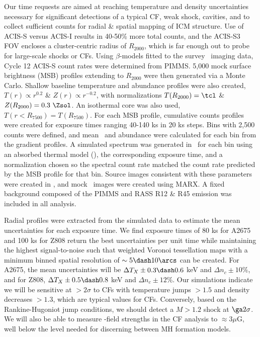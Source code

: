 \documentclass[letterpaper,11pt]{article}
\begin{document}
 Our time requests are aimed
at reaching temperature and density uncertainties necessary for
significant detections of a typical CF, weak shock, cavities, and to
collect sufficient counts for radial \& spatial mapping of ICM
structure. Use of ACIS-S versus ACIS-I results in 40-50\% more total
counts, and the ACIS-S3 FOV encloses a cluster-centric radius of
$R_{2000}$, which is far enough out to probe for large-scale shocks or
CFs. Using $\beta$-models fitted to the survey \rosat\ imaging data,
Cycle 12 ACIS-S count rates were determined from PIMMS. 5,000 mock
surface brightness (MSB) profiles extending to $R_{2000}$ were then
generated via a Monte Carlo. Shallow baseline temperature and
abundance profiles were also created, $T(r) \propto r^{0.2}$ \& $Z(r)
\propto r^{-0.2}$, with normalizations $T(R_{2000}) = \tcl$ \&
$Z(R_{2000}) = 0.3 ~\Zsol$. An isothermal core was also used,
$T(r<R_{7500}) = T(R_{7500})$. For each MSB profile, cumulative counts
profiles were created for exposure times ranging 40-140 ks in 20 ks
steps. Bins with 2,500 counts were defined, and mean \tx\ and
abundance were calculated for each bin from the gradient profiles. A
simulated spectrum was generated in \xspec\ for each bin using an
absorbed thermal model (\mekal), the corresponding exposure time, and
a normalization chosen so the spectral count rate matched the count
rate predicted by the MSB profile for that bin. Source images
consistent with these parameters were created in \idl, and mock
\chandra\ images were created using MARX. A fixed background composed
of the PIMMS and RASS R12 \& R45 emission was included in all
analysis.

Radial profiles were extracted from the simulated data to estimate the
mean uncertainties for each exposure time. We find exposure times of
80 ks for A2675 and 100 ks for Z808 return the best uncertainties per
unit time while maintaining the highest signal-to-noise such that
weighted Voronoi tessellation maps with a minimum binned spatial
resolution of $\sim 5 \dash 10\arcs$ can be created. For A2675, the
mean uncertainties will be $\Delta T_X \pm 0.3 \dash 0.6$ keV and
$\Delta n_c \pm 10\%$, and for Z808, $\Delta T_X \pm 0.5 \dash 0.8$
keV and $\Delta n_c \pm 12\%$. Our simulations indicate we will be
sensitive at $> 2\sigma$ to CFs with temperature jumps $> 1.5$ and
density decreases $> 1.3$, which are typical values for
CFs. Conversely, based on the Rankine-Hugoniot jump conditions, we
should detect a $M > 1.2$ shock at $\ga 2\sigma$. We will also be able
to measure \bmag-field strengths in the CF analysis to $\approx
3\mu$G, well below the level needed for discerning between MH
formation models.
\end{document}
